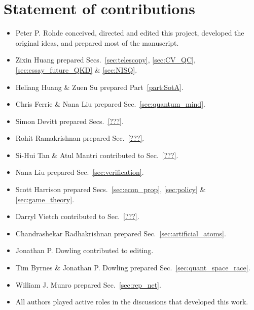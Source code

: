 %
%

\section*{Statement of contributions}

\begin{itemize}
	\item Peter P. Rohde conceived, directed and edited this project, developed the original ideas, and prepared most of the manuscript.
	\item Zixin Huang prepared Secs.~\ref{sec:telescopy}, \ref{sec:CV_QC}, \ref{sec:essay_future_QKD} \& \ref{sec:NISQ}.
	\item Heliang Huang \& Zuen Su prepared Part~\ref{part:SotA}.
	\item Chris Ferrie \& Nana Liu prepared Sec.~\ref{sec:quantum_mind}.
	\item Simon Devitt prepared Secs.~\ref{???}.
	\item Rohit Ramakrishnan prepared Sec.~\ref{???}.
	\item Si-Hui Tan \& Atul Mantri contributed to Sec.~\ref{???}.
	\item Nana Liu prepared Sec.~\ref{sec:verification}.
	\item Scott Harrison prepared Secs.~\ref{sec:econ_prop}, \ref{sec:policy} \& \ref{sec:game_theory}.
	\item Darryl Vietch contributed to Sec.~\ref{???}.
	\item Chandrashekar Radhakrishnan prepared Sec.~\ref{sec:artificial_atoms}.
	\item Jonathan P. Dowling contributed to editing.
	\item Tim Byrnes \& Jonathan P. Dowling prepared Sec.~\ref{sec:quant_space_race}.
	\item William J. Munro prepared Sec.~\ref{sec:rep_net}. 
	\item All authors played active roles in the discussions that developed this work. 
\end{itemize}